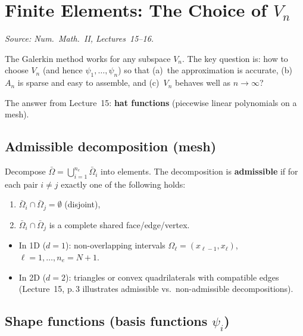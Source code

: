 \documentclass[11pt,a4paper]{article}
\theoremstyle{plain}
\theoremstyle{remark}
\newcommand{\Vn}{V_n}
\let\origsubsection\subsection
\renewcommand{\subsection}{\needspace{6\baselineskip}\origsubsection}
\begin{document}
\newpage
\section{Finite Elements: The Choice of $V_n$}
\label{sec:elements}

\textit{Source: Num.\ Math.\ II, Lectures~15--16.}

\medskip\noindent
The Galerkin method works for any subspace $\Vn$.
The key question is: how to choose $\Vn$ (and hence $\psi_1,\ldots,\psi_n$)
so that (a)~the approximation is accurate, (b)~$A_n$ is sparse and
easy to assemble, and (c)~$\Vn$ behaves well as $n \to \infty$?

The answer from Lecture~15: \textbf{hat functions} (piecewise linear
polynomials on a mesh).

\subsection{Admissible decomposition (mesh)}

\begin{definition}
Decompose $\bar{\Omega} = \bigcup_{i=1}^{n_e} \bar{\Omega}_i$ into
elements.  The decomposition is \textbf{admissible} if for each pair
$i \neq j$ exactly one of the following holds:
\begin{enumerate}[nosep]
  \item $\bar{\Omega}_i \cap \bar{\Omega}_j = \emptyset$ \quad(disjoint),
  \item $\bar{\Omega}_i \cap \bar{\Omega}_j$ is a complete shared
        face/edge/vertex.
\end{enumerate}
\begin{itemize}[nosep]
  \item In 1D ($d=1$): non-overlapping intervals
        $\Omega_\ell = (x_{\ell-1}, x_\ell)$,
        $\ell = 1,\ldots,n_e = N+1$.
  \item In 2D ($d=2$): triangles or convex quadrilaterals with
        compatible edges (Lecture~15, p.\,3 illustrates admissible
        vs.\ non-admissible decompositions).
\end{itemize}
\end{definition}

\subsection{Shape functions (basis functions $\psi_i$)}
\end{document}
